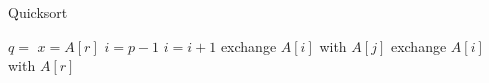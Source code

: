 \begin{algorithm}
\caption{Quicksort}
\begin{algorithmic}
        \STATE $q = $ 
        \STATE {}
        \STATE {}
    \ENDIF
\ENDPROCEDURE
{}
    \STATE $x = A[r]$
    \STATE $i = p - 1$
            \STATE $i = i + 1$
            \STATE exchange
            $A[i]$ with $A[j]$
        \ENDIF
        \STATE exchange $A[i]$ with $A[r]$
    \ENDFOR
\ENDPROCEDURE
\end{algorithmic}
\end{algorithm}